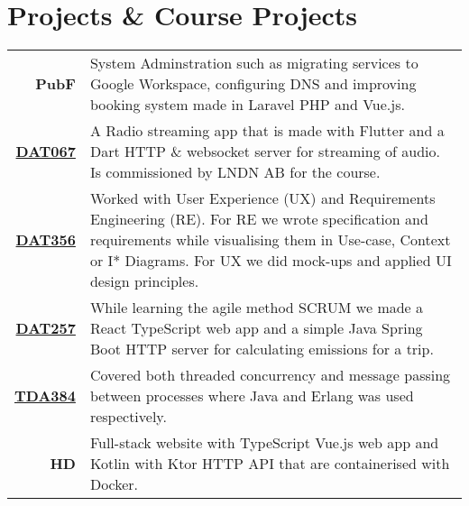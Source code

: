\section{Projects \& Course Projects}\label{sec:projects-&-course-projects}
\begin{tabular}{>{\footnotesize\bfseries}r >{\footnotesize}p{}}
    PubF & System Adminstration such as migrating services to Google Workspace, configuring DNS and improving booking system made in Laravel PHP and Vue.js. \vspace{3px} \\
    \href{https://www.student.chalmers.se/sp/course?course_id=34088}{DAT067} & A Radio streaming app that is made with Flutter and a Dart HTTP \& websocket server for streaming of audio. Is commissioned by LNDN AB for the course.  \vspace{3px} \\
    \href{https://www.student.chalmers.se/sp/course?course_id=33536}{DAT356} & Worked with User Experience (UX) and Requirements Engineering (RE). For RE we wrote specification and requirements while visualising them in Use-case, Context or I* Diagrams. For UX we did mock-ups and applied UI design principles. \vspace{3px} \\
    \href{https://www.student.chalmers.se/sp/course?course_id=34092}{DAT257} & While learning the agile method SCRUM we made a React TypeScript web app and a simple Java Spring Boot HTTP server for calculating emissions for a trip.\vspace{3px} \\
    \href{https://www.student.chalmers.se/sp/course?course_id=34004}{TDA384} & Covered both threaded concurrency and message passing between processes where Java and Erlang was used respectively. \vspace{3px} \\
    HD & Full-stack website with TypeScript Vue.js web app and Kotlin with Ktor HTTP API that are containerised with Docker. \vspace{3px} \\

\end{tabular}
